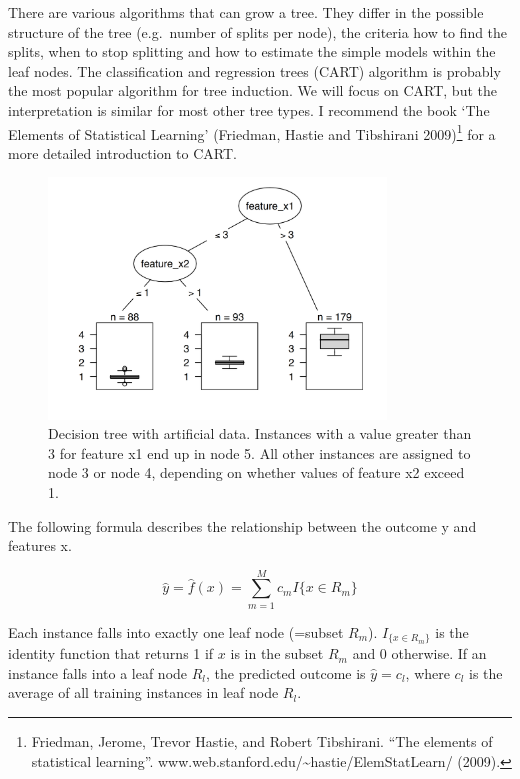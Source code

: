 \documentclass[
  11pt,
]{scrbook}
\begin{document}
There are various algorithms that can grow a tree.
They differ in the possible structure of the tree (e.g.~number of splits per node), the criteria how to find the splits, when to stop splitting and how to estimate the simple models within the leaf nodes.
The classification and regression trees (CART) algorithm is probably the most popular algorithm for tree induction.
We will focus on CART, but the interpretation is similar for most other tree types.
I recommend the book `The Elements of Statistical Learning' (Friedman, Hastie and Tibshirani 2009)\footnote{Friedman, Jerome, Trevor Hastie, and Robert Tibshirani. ``The elements of statistical learning''. www.web.stanford.edu/\textasciitilde hastie/ElemStatLearn/ (2009).} for a more detailed introduction to CART.

\begin{figure}

{\centering \includegraphics[width=0.8\textwidth]{images/tree-artificial-1} 

}

\caption{Decision tree with artificial data. Instances with a value greater than 3 for feature x1 end up in node 5. All other instances are assigned to node 3 or node 4, depending on whether values of feature x2  exceed 1.}\label{fig:tree-artificial}
\end{figure}

The following formula describes the relationship between the outcome y and features x.

\[\hat{y}=\hat{f}(x)=\sum_{m=1}^Mc_m{}I\{x\in{}R_m\}\]

Each instance falls into exactly one leaf node (=subset \(R_m\)).
\(I_{\{x\in{}R_m\}}\) is the identity function that returns 1 if \(x\) is in the subset \(R_m\) and 0 otherwise.
If an instance falls into a leaf node \(R_l\), the predicted outcome is \(\hat{y}=c_l\), where \(c_l\) is the average of all training instances in leaf node \(R_l\).
\end{document}
